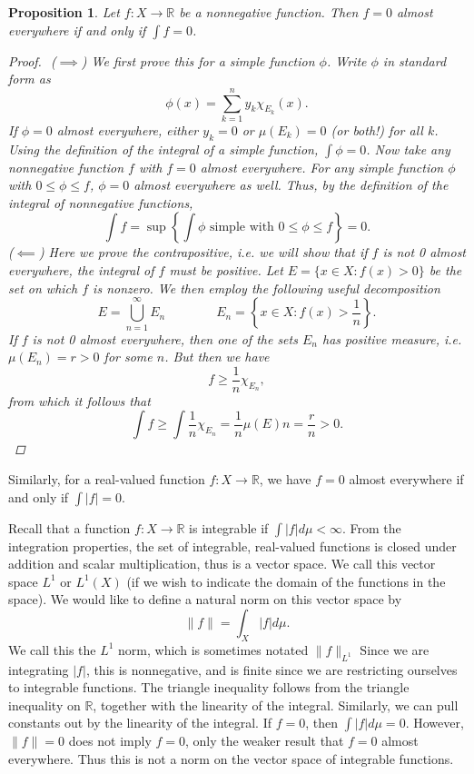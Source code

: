 \documentclass[12pt]{amsart}         %
\newtheorem{proposition}{Proposition}[section]
\theoremstyle{remark}
\newcommand{\R}{\mathbb{R}}
\begin{document}
\begin{proposition}
Let $f: X \rightarrow \R$ be a nonnegative function. Then $f = 0$ almost everywhere if and only if $\int f = 0$.
\begin{proof}$ $\newline
($\implies$) We first prove this for a simple function $\phi$. Write $\phi$ in standard form as 
\[
\phi(x) = \sum_{k = 1}^n
y_k \chi_{E_k}(x).
\]
If $\phi = 0$ almost everywhere, either $y_k = 0$ or $\mu(E_k) = 0$ (or both!) for all $k$. Using the definition of the integral of a simple function, $\int \phi = 0$. Now take any nonnegative function $f$ with $f = 0$ almost everywhere. For any simple function $\phi$ with $0 \leq \phi \leq f$, $\phi = 0$ almost everywhere as well. Thus, by the definition of the integral of nonnegative functions,
\[
\int f = \sup\left\{ \int \phi \text{ simple with }0 \leq \phi \leq f \right\} = 0.
\]
($\impliedby$) Here we prove the contrapositive, i.e. we will show that if $f$ is not 0 almost everywhere, the integral of $f$ must be positive. Let $E = \{ x \in X : f(x) > 0 \}$ be the set on which $f$ is nonzero. We then employ the following useful decomposition
\[
E = \bigcup_{n=1}^\infty E_n \qquad \qquad
E_n = \left\{ x \in X : f(x) > \frac{1}{n} \right\}.
\]
If $f$ is not 0 almost everywhere, then one of the sets $E_n$ has positive measure, i.e. $\mu(E_n) = r > 0$ for some $n$. But then we have
\[
f \geq \frac{1}{n}\chi_{E_n},
\]
from which it follows that
\[
\int f \geq \int \frac{1}{n}\chi_{E_n} = \frac{1}{n} \mu(E)n = \frac{r}{n} > 0.
\]
\end{proof}
\end{proposition}

Similarly, for a real-valued function $f:X \rightarrow \R$, we have $f = 0$ almost everywhere if and only if $\int |f| = 0$.

Recall that a function $f:X \rightarrow \R$ is integrable if $\int |f| d\mu < \infty$. From the integration properties, the set of integrable, real-valued functions is closed under addition and scalar multiplication, thus is a vector space. We call this vector space $L^1$ or $L^1(X)$ (if we wish to indicate the domain of the functions in the space). We would like to define a natural norm on this vector space by
\[
\|f\| = \int_X |f| d\mu.
\]
We call this the $L^1$ norm, which is sometimes notated $\|f\|_{L^1}$
Since we are integrating $|f|$, this is nonnegative, and is finite since we are restricting ourselves to integrable functions. The triangle inequality follows from the triangle inequality on $\R$, together with the linearity of the integral. Similarly, we can pull constants out by the linearity of the integral. If $f = 0$, then $\int |f|d\mu = 0$. However, $\|f\| = 0$ does not imply $f = 0$, only the weaker result that $f = 0$ almost everywhere. Thus this is not a norm on the vector space of integrable functions.
\end{document}
